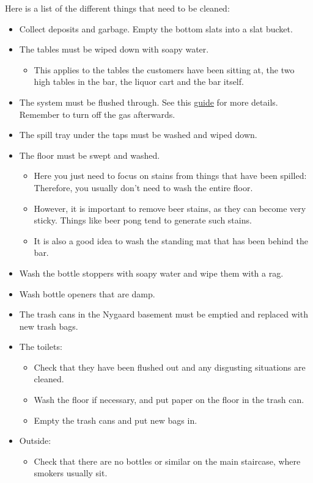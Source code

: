 Here is a list of the different things that need to be cleaned:
\begin{itemize}
	\item Collect deposits and garbage. Empty the bottom slats into a slat bucket.
	\item The tables must be wiped down with soapy water.
	\begin{itemize}
		\item This applies to the tables the customers have been sitting at, 
		the two high tables in the bar, the liquor cart and the bar itself.
	\end{itemize}
	\item The system must be flushed through. See this \href{https://media.fredagscafeen.dk/guides/rensningafanlaeg.pdf}{guide} for more
	details. Remember to turn off the gas afterwards.
	\item The spill tray under the taps must be washed and wiped down.
	\item The floor must be swept and washed.
	\begin{itemize}
		\item Here you just need to focus on stains from things that have been spilled:
		Therefore, you usually don't need to wash the entire floor.
		\item However, it is important to remove beer stains, as they can become very
		sticky. Things like beer pong tend to generate such stains.
		\item It is also a good idea to wash the standing mat that has been behind the bar.
	\end{itemize}
	\item Wash the bottle stoppers with soapy water and wipe them with a rag.
	\item Wash bottle openers that are damp.
	\item The trash cans in the Nygaard basement must be emptied and replaced with new trash bags.
	\item The toilets:
	\begin{itemize}
		\item Check that they have been flushed out and any disgusting situations are cleaned.
		\item Wash the floor if necessary, and put paper on the floor in the trash can.
		\item Empty the trash cans and put new bags in.
	\end{itemize}
	\item Outside:
	\begin{itemize}
		\item Check that there are no bottles or similar on the main staircase,
		where smokers usually sit.
	\end{itemize}
\end{itemize}

